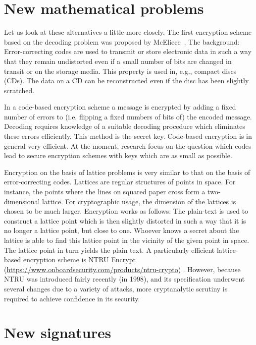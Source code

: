 \begin{bibunit}[babalpha]
\section{New mathematical problems}
\label{sec:problems}

Let us look at these alternatives a little more
closely.  The first encryption scheme based on the
decoding problem was proposed by
McEliece~\cite{mceliece:1978}.  The background:
Error-correcting codes are used to transmit or
store electronic data in such a way that they
remain undistorted even if a small number of bits
are changed in transit or on the storage media.
This property is used in, e.g., compact discs
(CDs).  The data on a CD can be reconstructed even
if the disc has been slightly scratched.

In a code-based encryption scheme a message is
encrypted by adding a fixed number of errors to
(i.e. flipping a fixed numbers of bits of) the
encoded message.  Decoding requires knowledge of a
suitable decoding procedure which eliminates these
errors efficiently.  This method is the secret
key.  Code-based encryption is in general very
efficient.  At the moment, research focus on the
question which codes lead to secure encryption
schemes with keys which are as small as possible.

Encryption on the basis of lattice problems
is very similar to that on the basis of
error-correcting codes.  Lattices are regular
structures of points in space.  For instance, the
points where the lines on squared paper cross form
a two-dimensional lattice.  For cryptographic
usage, the dimension of the lattices is chosen to
be much larger.  Encryption works as follows: The
plain-text is used to construct a lattice point
which is then slightly distorted in such a way
that it is no longer a lattice point, but close to
one.  Whoever knows a secret about the lattice is
able to find this lattice point in the vicinity of
the given point in space.  The lattice point in
turn yields the plain text.  A particularly
efficient lattice-based encryption scheme is NTRU
Encrypt (\url{https://www.onboardsecurity.com/products/ntru-crypto})
.
However, because
NTRU was introduced fairly recently (in 1998), and
its specification underwent several changes due to
a variety of attacks, more cryptanalytic scrutiny
is required to achieve confidence in its security.

\section{New signatures}
\label{sec:signatures}


\end{bibunit}
